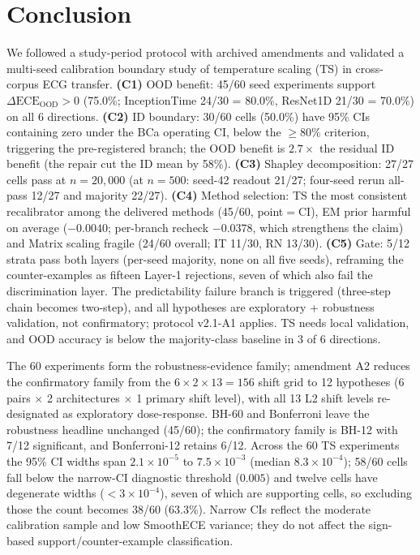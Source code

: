 \documentclass[review,12pt,nonatbib]{elsarticle}
\begin{document}
\section{Conclusion}
\label{sec:conclusion}
We followed a study-period protocol with archived amendments and
validated a multi-seed calibration boundary study of temperature scaling
(TS) in cross-corpus ECG transfer. \textbf{(C1)}
OOD benefit: 45/60 seed experiments support
$\Delta\text{ECE}_{\text{OOD}}>0$ (75.0\%; InceptionTime 24/30 = 80.0\%,
ResNet1D 21/30 = 70.0\%) on all 6 directions. \textbf{(C2)} ID boundary:
30/60 cells (50.0\%) have 95\% CIs containing zero under the BCa
operating CI, below the $\geq$80\%
criterion, triggering the pre-registered branch; the OOD benefit is
$2.7\times$ the residual ID benefit (the repair cut the ID mean by
58\%). \textbf{(C3)} Shapley decomposition: 27/27
cells pass at $n=20{,}000$ (at $n=500$: seed-42 readout 21/27; four-seed
rerun all-pass 12/27 and majority 22/27). \textbf{(C4)} Method
selection: TS the most consistent recalibrator among the delivered
methods (45/60, point$=$CI), EM
prior harmful on average ($-0.0040$; per-branch recheck $-0.0378$, which
strengthens the claim) and Matrix scaling fragile (24/60
overall; IT 11/30, RN 13/30). \textbf{(C5)} Gate: 5/12 strata pass both layers
(per-seed majority, none on all five seeds),
reframing the counter-examples as fifteen Layer-1 rejections, seven of which
also fail the discrimination layer. The
predictability failure branch is triggered (three-step chain becomes
two-step), and all hypotheses are exploratory + robustness validation,
not confirmatory; protocol v2.1-A1 applies. TS needs local
validation, and OOD accuracy is below the
majority-class baseline in 3 of 6 directions.

The 60 experiments form the robustness-evidence family; amendment A2
reduces the confirmatory family from the $6 \times 2 \times 13 = 156$
shift grid to 12 hypotheses (6 pairs $\times$ 2 architectures $\times$ 1
primary shift level), with all 13 L2 shift levels re-designated as
exploratory dose-response. BH-60 and Bonferroni
leave the robustness headline unchanged (45/60); the confirmatory family
is BH-12 with 7/12 significant, and Bonferroni-12
retains 6/12. Across the 60 TS experiments the 95\% CI widths span
$2.1\times10^{-5}$ to $7.5\times10^{-3}$ (median $8.3\times10^{-4}$);
58/60 cells fall below the narrow-CI diagnostic threshold ($0.005$) and
twelve cells have degenerate widths ($<3\times10^{-4}$), seven of which
are supporting cells, so
excluding those the count becomes 38/60 (63.3\%). Narrow CIs reflect
the moderate calibration sample and low SmoothECE variance; they do not
affect the sign-based support/counter-example classification.
\end{document}
